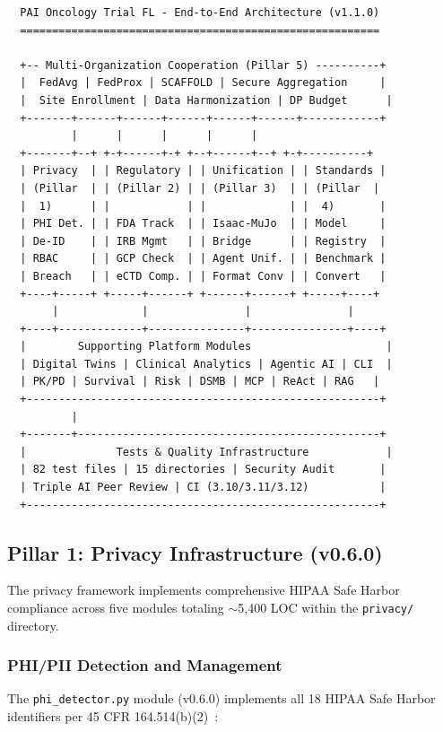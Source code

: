 \begin{verbatim}
  PAI Oncology Trial FL - End-to-End Architecture (v1.1.0)
  ========================================================

  +-- Multi-Organization Cooperation (Pillar 5) ----------+
  |  FedAvg | FedProx | SCAFFOLD | Secure Aggregation     |
  |  Site Enrollment | Data Harmonization | DP Budget      |
  +-------+------+------+------+------+------+------------+
          |      |      |      |      |
  +-------+--+ +-+------+-+ +--+------+--+ +-+----------+
  | Privacy  | | Regulatory | | Unification | | Standards |
  | (Pillar  | | (Pillar 2) | | (Pillar 3)  | | (Pillar  |
  |  1)      | |            | |             | |  4)       |
  | PHI Det. | | FDA Track  | | Isaac-MuJo  | | Model     |
  | De-ID    | | IRB Mgmt   | | Bridge      | | Registry  |
  | RBAC     | | GCP Check  | | Agent Unif. | | Benchmark |
  | Breach   | | eCTD Comp. | | Format Conv | | Convert   |
  +----+-----+ +-----+------+ +------+------+ +-----+----+
       |             |               |               |
  +----+-------------+---------------+---------------+----+
  |        Supporting Platform Modules                     |
  | Digital Twins | Clinical Analytics | Agentic AI | CLI  |
  | PK/PD | Survival | Risk | DSMB | MCP | ReAct | RAG   |
  +-------------------------------------------------------+
          |
  +-------+-----------------------------------------------+
  |              Tests & Quality Infrastructure            |
  | 82 test files | 15 directories | Security Audit       |
  | Triple AI Peer Review | CI (3.10/3.11/3.12)           |
  +-------------------------------------------------------+
\end{verbatim}

\subsection{Pillar 1: Privacy Infrastructure (v0.6.0)}
\label{sec:privacy}

The privacy framework implements comprehensive HIPAA Safe Harbor compliance across five modules totaling $\sim$5,400 LOC within the \texttt{privacy/} directory.

\subsubsection{PHI/PII Detection and Management}

The \texttt{phi\_detector.py} module (v0.6.0) implements all 18 HIPAA Safe Harbor identifiers per 45 CFR 164.514(b)(2)~\cite{hipaa_safeharbor}:

